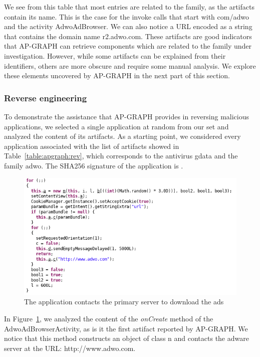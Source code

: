 We see from this table that most entries are related to the family, as the artifacts contain its name.
This is the case for the invoke calls that start with com/adwo and the activity AdwoAdBrowser.
We can also notice a URL encoded as a string that contains the domain name r2.adwo.com.
These artifacts are good indicators that AP-GRAPH can retrieve components which are related to the family under investigation.
However, while some artifacts can be explained from their identifiers, others are more obscure and require some manual analysis.
We explore these elements uncovered by AP-GRAPH in the next part of this section.
\subsubsection{Reverse engineering}
To demonstrate the assistance that AP-GRAPH provides in reversing malicious applications, we selected a single application at random from our set and analyzed the content of its artifacts.
As a starting point, we considered every application associated with the list of artifacts showed in Table~\ref{table:apgraph:rev}, which corresponds to the antivirus gdata and the family adwo.
The SHA256 signature of the application is .

\begin{figure}[!ht]
        \centering
	\includegraphics[width=\linewidth]{figures/apgraph/contact.png}
	\caption{The application contacts the primary server to download the ads}
	\label{figure:apgraph:contact}
\end{figure}

In Figure~\ref{figure:apgraph:contact}, we analyzed the content of the \textit{onCreate} method of the AdwoAdBrowserActivity, as is it the first artifact reported by AP-GRAPH.
We notice that this method constructs an object of class n and contacts the adware server at the URL: http://www.adwo.com.

